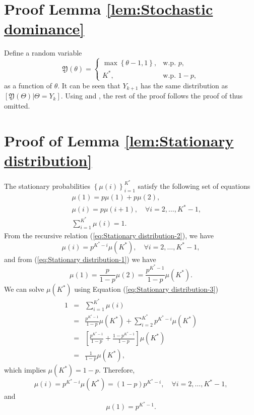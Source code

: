 \documentclass[12pt,technote,onecolumn]{IEEEtran}
\begin{document}
\section*{Proof Lemma \ref{lem:Stochastic dominance}}
\begin{IEEEproof}
	Define a random variable 
	\[
	\mathfrak{Y}\left(\theta\right)=\begin{cases}
	\max\left\{ \theta-1,1\right\} , & \mbox{w.p. }p,\\
	K^{*}, & \mbox{w.p. }1-p,
	\end{cases}
	\]
	as a function of $\theta.$ It can be seen that $Y_{k+1}$ has the
	same distribution as $\left[\mathfrak{Y}\left(\Theta\right)|\Theta=Y_{k}\right].$
	Using \cite[Theorem 1.A.3(d)]{Shaked2007} and \cite[Theorem 1.A.6]{Shaked2007},
	the rest of the proof follows the proof of \cite[Theorem 4.1]{Haskell_EDP_2015}
	thus omitted.
\end{IEEEproof}


\section*{Proof of Lemma \ref{lem:Stationary distribution}}
\begin{IEEEproof}
	The stationary probabilities $\left\{ \mu\left(i\right)\right\} _{i=1}^{K^{*}}$
	satisfy the following set of equations
	\begin{eqnarray}
	&  & \mu\left(1\right)=p\mu\left(1\right)+p\mu\left(2\right),\label{eq:Stationary distribution-1}\\
	&  & \mu\left(i\right)=p\mu\left(i+1\right),\quad\forall i=2,\dots,K^{*}-1,\label{eq:Stationary distribution-2}\\
	&  & \sum_{i=1}^{K^{*}}\mu\left(i\right)=1.\label{eq:Stationary distribution-3}
	\end{eqnarray}
	From the recursive relation (\ref{eq:Stationary distribution-2}),
	we have 
	\[
	\mu\left(i\right)=p^{K^{*}-i}\mu\left(K^{*}\right),\quad\forall i=2,\dots,K^{*}-1,
	\]
	and from (\ref{eq:Stationary distribution-1}) we have
	\[
	\mu\left(1\right)=\frac{p}{1-p}\mu\left(2\right)=\frac{p^{K^{*}-1}}{1-p}\mu\left(K^{*}\right).
	\]	
	We can solve $\mu\left(K^{*}\right)$ using Equation (\ref{eq:Stationary distribution-3})
	\begin{eqnarray*}
		1 & = & \sum_{i=1}^{K^{*}}\mu\left(i\right)\\
		& = & \frac{p^{K^{*}-1}}{1-p}\mu\left(K^{*}\right)+\sum_{i=2}^{K^{*}}p^{K^{*}-i}\mu\left(K^{*}\right)\\
		& = & \left[\frac{p^{K^{*}-1}}{1-p}+\frac{1-p^{K^{*}-1}}{1-p}\right]\mu\left(K^{*}\right)\\
		& = & \frac{1}{1-p}\mu\left(K^{*}\right),
	\end{eqnarray*}
	which implies $\mu\left(K^{*}\right)=1-p.$ Therefore, 
	\[
	\mu\left(i\right)=p^{K^{*}-i}\mu\left(K^{*}\right)=\left(1-p\right)p^{K^{*}-i},\quad\forall i=2,\dots,K^{*}-1,
	\]
	and
	\[
	\mu\left(1\right)=p^{K^{*}-1}.
	\]
\end{IEEEproof}
\end{document}
